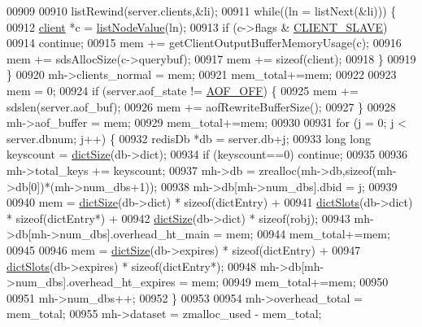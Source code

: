 \begin{DoxyCode}
{00909 
00910         listRewind(server.clients,&li);
00911         \textcolor{keywordflow}{while}((ln = listNext(&li))) \{
00912             \hyperlink{structclient}{client} *c = \hyperlink{adlist_8h_af84cae230e7180ebcda1e2736fce9f65}{listNodeValue}(ln);
00913             \textcolor{keywordflow}{if} (c->flags & \hyperlink{server_8h_ae9f6995948253652bc9454d79a72f4a7}{CLIENT\_SLAVE})
00914                 \textcolor{keywordflow}{continue};
00915             mem += getClientOutputBufferMemoryUsage(c);
00916             mem += sdsAllocSize(c->querybuf);
00917             mem += \textcolor{keyword}{sizeof}(client);
00918         \}
00919     \}
00920     mh->clients\_normal = mem;
00921     mem\_total+=mem;
00922 
00923     mem = 0;
00924     \textcolor{keywordflow}{if} (server.aof\_state != \hyperlink{server_8h_a5226306fbcebcb6d5d02e0fef3c213c2}{AOF\_OFF}) \{
00925         mem += sdslen(server.aof\_buf);
00926         mem += aofRewriteBufferSize();
00927     \}
00928     mh->aof\_buffer = mem;
00929     mem\_total+=mem;
00930 
00931     \textcolor{keywordflow}{for} (j = 0; j < server.dbnum; j++) \{
00932         redisDb *db = server.db+j;
00933         \textcolor{keywordtype}{long} \textcolor{keywordtype}{long} keyscount = \hyperlink{dict_8h_af193430dd3d5579a52b194512f72c1f0}{dictSize}(db->dict);
00934         \textcolor{keywordflow}{if} (keyscount==0) \textcolor{keywordflow}{continue};
00935 
00936         mh->total\_keys += keyscount;
00937         mh->db = zrealloc(mh->db,\textcolor{keyword}{sizeof}(mh->db[0])*(mh->num\_dbs+1));
00938         mh->db[mh->num\_dbs].dbid = j;
00939 
00940         mem = \hyperlink{dict_8h_af193430dd3d5579a52b194512f72c1f0}{dictSize}(db->dict) * \textcolor{keyword}{sizeof}(dictEntry) +
00941               \hyperlink{dict_8h_aca9596be4bcc2caa07c17dd8cebcceec}{dictSlots}(db->dict) * \textcolor{keyword}{sizeof}(dictEntry*) +
00942               \hyperlink{dict_8h_af193430dd3d5579a52b194512f72c1f0}{dictSize}(db->dict) * \textcolor{keyword}{sizeof}(robj);
00943         mh->db[mh->num\_dbs].overhead\_ht\_main = mem;
00944         mem\_total+=mem;
00945 
00946         mem = \hyperlink{dict_8h_af193430dd3d5579a52b194512f72c1f0}{dictSize}(db->expires) * \textcolor{keyword}{sizeof}(dictEntry) +
00947               \hyperlink{dict_8h_aca9596be4bcc2caa07c17dd8cebcceec}{dictSlots}(db->expires) * \textcolor{keyword}{sizeof}(dictEntry*);
00948         mh->db[mh->num\_dbs].overhead\_ht\_expires = mem;
00949         mem\_total+=mem;
00950 
00951         mh->num\_dbs++;
00952     \}
00953 
00954     mh->overhead\_total = mem\_total;
00955     mh->dataset = zmalloc\_used - mem\_total;
}
\end{DoxyCode}
